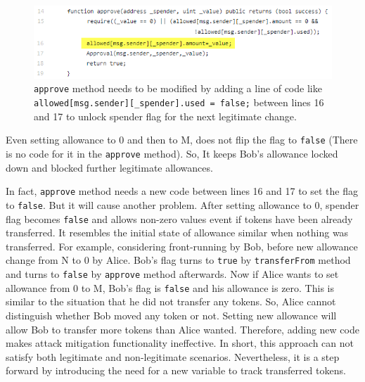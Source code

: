 \begin{figure}[t]
	\centering
	\includegraphics[width=1.0\linewidth]{figures/multiple_withdrawal_33.png}
	\caption{\texttt{approve} method needs to be modified by adding a line of code like \texttt{allowed[msg.sender][\_spender].used = false;} between lines 16 and 17 to unlock spender flag for the next legitimate change.\label{fig:det}}
\end{figure}

\noindent Even setting allowance to 0 and then to M, does not flip the flag to \texttt{false} (There is no code for it in the \texttt{approve} method). So, It keeps Bob’s allowance locked down and blocked further legitimate allowances.

In fact, \texttt{approve} method needs a new code between lines 16 and 17 to set the flag to \texttt{false}. But it will cause another problem. After setting allowance to 0, spender flag becomes \texttt{false} and allows non-zero values event if tokens have been already transferred. It resembles the initial state of allowance similar when nothing was transferred. For example, considering front-running by Bob, before new allowance change from N to 0 by Alice. Bob's flag turns to \texttt{true} by \texttt{transferFrom} method and turns to \texttt{false} by \texttt{approve} method afterwards. Now if Alice wants to set allowance from 0 to M, Bob's flag is \texttt{false} and his allowance is zero. This is similar to the situation that he did not transfer any tokens. So, Alice cannot distinguish whether Bob moved any token or not. Setting new allowance will allow Bob to transfer more tokens than Alice wanted. Therefore, adding new code makes attack mitigation functionality ineffective. In short, this approach can not satisfy both legitimate and non-legitimate scenarios. Nevertheless, it is a step forward by introducing the need for a new variable to track transferred tokens.\newline

